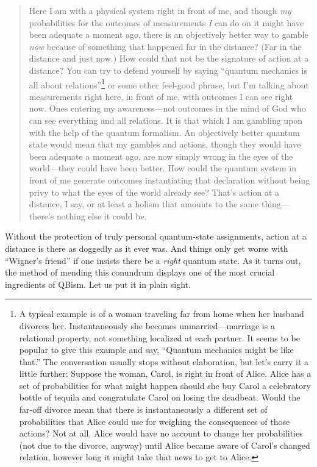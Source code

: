 \documentclass[aps,pra,superscriptaddress,10pt,tightenlines,twocolumn,nofootinbib]{revtex4}
\begin{document}
\begin{quote}
 Here I am with a physical system right in front of me, and though {\it my\/} probabilities for the outcomes of measurements {\it I\/} can do on it might have been adequate a moment ago, there is an objectively better way to gamble {\it now\/} because of something that happened far in the distance?  (Far in the distance and just now.)  How could that not be the signature of action at a distance?  You can try to defend yourself by saying ``quantum mechanics is all about relations''\footnote{A typical example is of a woman traveling far from home when her husband divorces her.  Instantaneously she becomes unmarried---marriage is a relational property, not something localized at each partner.  It seems to be popular to give this example and say, ``Quan\-tum mechanics might be like that.''  The conversation usually stops without elaboration, but let's carry it a little further:  Suppose the woman, Carol, is right in front of Alice.  Alice has a set of probabilities for what might happen should she buy Carol a celebratory bottle of tequila and congratulate Carol on losing the deadbeat.  Would the far-off divorce mean that there is instantaneously a different set of probabilities that Alice could use for weighing the consequences of those actions?  Not at all.  Alice would have no account to change her probabilities (not due to the divorce, anyway) until Alice became aware of Carol's changed relation, however long it might take that news to get to Alice.} or some other feel-good phrase, but I'm talking about measurements right here, in front of me, with outcomes I can see right now.  Ones entering my awareness---not outcomes in the mind of God who can see everything and all relations.  It is that which I am gambling upon with the help of the quantum formalism.  An objectively better quantum state would mean that my gambles and actions, though they would have been adequate a moment ago, are now simply wrong in the eyes of the world---they could have been better.  How could the quantum system in front of me generate outcomes instantiating that declaration without being privy to what the eyes of the world already see?  That's action at a distance, I say, or at least a holism that amounts to the same thing---there's nothing else it could be.
\end{quote}

Without the protection of truly personal quantum-state assignments, action at a distance is there as doggedly as it ever was.  And things only get worse with ``Wigner's friend'' if one insists there be a {\it right\/} quantum state.  As it turns out, the method of mending this conundrum displays one of the most crucial ingredients of QBism.  Let us put it in plain sight.
\end{document}
